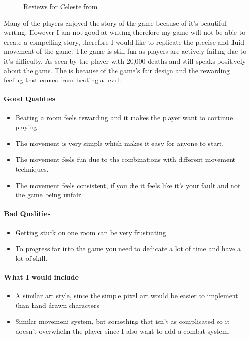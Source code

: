 \documentclass{article}
\begin{document}
\begin{figure}[h]
\begin{minipage}{0.4\linewidth}
\end{minipage}
\caption{Reviews for Celeste from \cite{Celss}}
\label{celeste reviews}
\end{figure}

Many of the players enjoyed the story of the game because of it's beautiful writing. However I am not good at writing therefore my game will not be able to create a compelling story, therefore I would like to replicate the precise and fluid movement of the game. The game is still fun as players are actively failing due to it's difficulty. As seen by the player with 20,000 deaths and still speaks positively about the game. The is because of the game's fair design and the rewarding feeling that comes from beating a level.

\paragraph{Good Qualities}
\begin{itemize}
\item Beating a room feels rewarding and it makes the player want to continue playing.
\item The movement is very simple which makes it easy for anyone to start.
\item The movement feels fun due to the combinations with different  movement techniques. 
\item The movement feels consistent, if you die it feels like it's your fault and not the game being unfair.
\end{itemize}

\paragraph{Bad Qualities}
\begin{itemize}
\item Getting stuck on one room can be very frustrating.
\item To progress far into the game you need to dedicate a lot of time and have a lot of skill.
\end{itemize}

\paragraph{What I would include}
\begin{itemize}
\item A similar art style, since the simple pixel art would be easier to implement than hand drawn characters.
\item Similar movement system, but something that isn't as complicated so it doesn't overwhelm the player since I also want to add a combat system.
\end{itemize}
\end{document}
